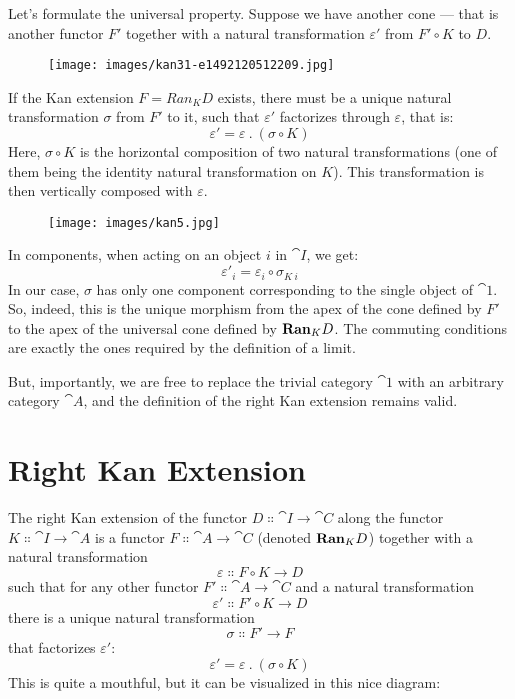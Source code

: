 Let's formulate the universal property. Suppose we have another cone ---
that is another functor $F'$ together with a natural
transformation $\varepsilon'$ from $F' \circ K$ to
$D$.

\begin{figure}[H]
\centering
\texttt{[image: images/kan31-e1492120512209.jpg]}
\end{figure}

\noindent
If the Kan extension $F = Ran_{K}D$ exists, there must be a unique
natural transformation $\sigma$ from $F'$ to it, such
that $\varepsilon'$ factorizes through $\varepsilon$, that is:
\[\varepsilon' = \varepsilon\ .\ (σ \circ K)\]
Here, $\sigma \circ K$ is the horizontal composition of two natural
transformations (one of them being the identity natural transformation
on $K$). This transformation is then vertically composed with
$\varepsilon$.

\begin{figure}[H]
\centering
\texttt{[image: images/kan5.jpg]}
\end{figure}

\noindent
In components, when acting on an object $i$ in $\cat{I}$, we get:
\[\varepsilon'_i = \varepsilon_i \circ \sigma_{K\ i}\]
In our case, $\sigma$ has only one component corresponding to the
single object of $\cat{1}$. So, indeed, this is the unique morphism
from the apex of the cone defined by $F'$ to the apex of
the universal cone defined by $\mathbf{Ran}_{K}D$. The commuting conditions
are exactly the ones required by the definition of a limit.

But, importantly, we are free to replace the trivial category $\cat{1}$
with an arbitrary category $\cat{A}$, and the definition of the right Kan
extension remains valid.

\section{Right Kan Extension}

The right Kan extension of the functor $D \Colon \cat{I} \to \cat{C}$
along the functor $K \Colon \cat{I} \to \cat{A}$ is a functor
$F \Colon \cat{A} \to \cat{C}$ (denoted $\mathbf{Ran}_{K}D$) together with a
natural transformation
\[\varepsilon \Colon F \circ K \to D\]
such that for any other functor $F' \Colon \cat{A} \to \cat{C}$ and
a natural transformation
\[\varepsilon' \Colon F' \circ K \to D\]
there is a unique natural transformation
\[\sigma \Colon F' \to F\]
that factorizes $\varepsilon'$:
\[\varepsilon' = \varepsilon\ .\ (\sigma \circ K)\]
This is quite a mouthful, but it can be visualized in this nice diagram:

